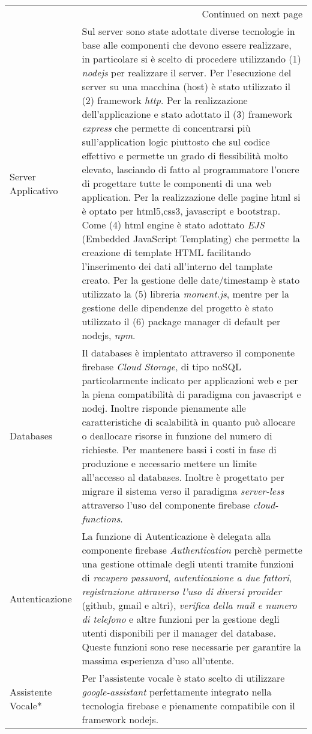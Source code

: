 \documentclass[onecolumn,a4paper]{article}
\begin{document}
\begin{longtable}{|l|p{10cm}|}
\hline
\endhead
\hline\multicolumn{2}{r}{Continued on next page} \\
\endfoot
\endlastfoot
\hline
Server Applicativo & Sul server sono state adottate diverse tecnologie in base alle componenti che devono essere realizzare, in particolare si è scelto di procedere utilizzando (1) \emph{nodejs} per realizzare il server. Per l'esecuzione del server su una macchina (host) è stato utilizzato il (2) framework \emph{http}. Per la realizzazione dell'applicazione e stato adottato il (3) framework \emph{express} che permette di concentrarsi più sull’application logic piuttosto che sul codice effettivo e permette un grado di flessibilità molto elevato, lasciando di fatto al programmatore l’onere di progettare tutte le componenti di una web application. Per la realizzazione delle pagine html si è optato per html5,css3, javascript e bootstrap. Come (4) html engine è stato adottato  \emph{EJS} (Embedded JavaScript Templating) che permette la creazione di template HTML facilitando l'inserimento dei dati all'interno del tamplate creato. Per la gestione delle date/timestamp è stato utilizzato la (5) libreria \emph{moment.js}, mentre per la gestione delle dipendenze del progetto è stato utilizzato il (6) package manager di default per nodejs, \emph{npm}.\\
\hline
Databases & Il databases è implentato attraverso il componente firebase \emph{Cloud Storage}, di tipo noSQL particolarmente indicato per applicazioni web e per la piena compatibilità di paradigma con javascript e nodej. Inoltre risponde pienamente alle caratteristiche di scalabilità in quanto può allocare o deallocare risorse in funzione del numero di richieste. Per mantenere bassi i costi in fase di produzione e necessario mettere un limite all'accesso al databases. Inoltre è progettato per migrare il sistema verso il paradigma \emph{server-less} attraverso l'uso del componente firebase \emph{cloud-functions}.\\
\hline
Autenticazione & La funzione di Autenticazione è delegata alla componente firebase \emph{Authentication} perchè permette una gestione ottimale degli utenti tramite funzioni di \emph{recupero password}, \emph{autenticazione a due fattori}, \emph{registrazione attraverso l'uso di diversi provider} (github, gmail e altri), \emph{verifica della mail e numero di telefono} e altre funzioni per la gestione degli utenti disponibili per il manager del database. Queste funzioni sono rese necessarie per garantire la massima esperienza d'uso all'utente.\\
\hline
Assistente Vocale* & Per l'assistente vocale è stato scelto di utilizzare \emph{google-assistant} perfettamente integrato nella tecnologia firebase e pienamente compatibile con il framework nodejs.\\
\hline
\end{longtable}
\end{document}

